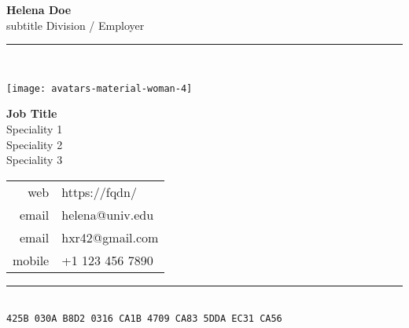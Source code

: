 \documentclass[11pt,a4paper]{memoir}
\begin{document}
    \begin{Spacing}{0.75}%
    \noindent
    \textbf{Helena Doe}\\
    \tiny subtitle \hfill {\color{gray}Division / Employer}\\ 
    \rule{74mm}{.3mm}\\
    \begin{minipage}[t]{33mm}
        \vspace{-0mm}%
        \texttt{[image: avatars-material-woman-4]}
    \end{minipage}
    \hspace{1mm}
    \begin{minipage}[t]{42mm}
        \vspace{-0mm}%
        \begin{flushleft}
        {\scriptsize
            \begin{Spacing}{1}%
            \textbf{Job Title}\\
            \hspace{5mm}Speciality 1\\
            \hspace{5mm}Speciality 2\\
            \hspace{5mm}Speciality 3 \vspace{2mm}\\
            \end{Spacing}
        }
        {\tiny
        	\begin{tabular}{rl}
            	{\color{gray}web} & https://fqdn/\\
            	{\color{gray}email} & helena@univ.edu\\
            	{\color{gray}email} & hxr42@gmail.com\\
            	{\color{gray}mobile} & +1 123 456 7890\\
            \end{tabular}
            \vspace*{2mm}
        }
        \end{flushleft}
    \end{minipage}
    \rule{74mm}{0mm}\\
    \texttt{\fontsize{2.84mm}{3.55mm}\selectfont 425B 030A B8D2 0316 CA1B 4709 CA83 5DDA EC31 CA56} %
    \end{Spacing}
\end{document}

